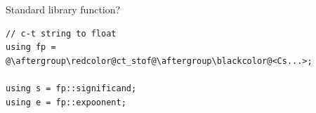 \documentclass[xcolor=dvipsnames]{beamer}
\begin{document}
\begin{frame}[fragile]{Standard library function?}
\begin{lstlisting}
// c-t string to float
using fp = @\aftergroup\redcolor@ct_stof@\aftergroup\blackcolor@<Cs...>;

using s = fp::significand;
using e = fp::expoonent;
\end{lstlisting}
\end{frame}


\begin{frame}[plain]
  \titlepage
\end{frame}
\end{document}
